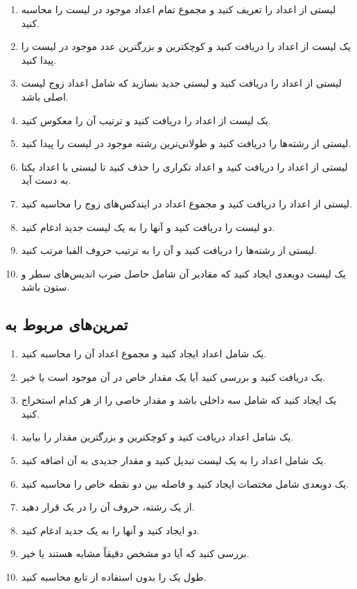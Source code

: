 \documentclass[b5paper,12pt]{article}
\begin{document}
	\begin{enumerate}
		\item لیستی از اعداد را تعریف کنید و مجموع تمام اعداد موجود در لیست را محاسبه کنید.
		\item یک لیست از اعداد را دریافت کنید و کوچکترین و بزرگترین عدد موجود در لیست را پیدا کنید.
		\item لیستی از اعداد را دریافت کنید و لیستی جدید بسازید که شامل اعداد زوج لیست اصلی باشد.
		\item یک لیست از اعداد را دریافت کنید و ترتیب آن را معکوس کنید.
		\item لیستی از رشته‌ها را دریافت کنید و طولانی‌ترین رشته موجود در لیست را پیدا کنید.
		\item لیستی از اعداد را دریافت کنید و اعداد تکراری را حذف کنید تا لیستی با اعداد یکتا به دست آید.
		\item لیستی از اعداد را دریافت کنید و مجموع اعداد در ایندکس‌های زوج را محاسبه کنید.
		\item دو لیست را دریافت کنید و آنها را به یک لیست جدید ادغام کنید.
		\item لیستی از رشته‌ها را دریافت کنید و آن را به ترتیب حروف الفبا مرتب کنید.
		\item یک لیست دو‌بعدی ایجاد کنید که مقادیر آن شامل حاصل ضرب اندیس‌های سطر و ستون باشد.
	\end{enumerate}
	
	\subsection*{تمرین‌های مربوط به }
	
	\begin{enumerate}
		\item یک  شامل اعداد ایجاد کنید و مجموع اعداد آن را محاسبه کنید.
		\item یک  دریافت کنید و بررسی کنید آیا یک مقدار خاص در آن موجود است یا خیر.
		\item یک  ایجاد کنید که شامل سه  داخلی باشد و مقدار خاصی را از هر کدام استخراج کنید.
		\item یک  شامل اعداد دریافت کنید و کوچکترین و بزرگترین مقدار را بیابید.
		\item یک  شامل اعداد را به یک لیست تبدیل کنید و مقدار جدیدی به آن اضافه کنید.
		\item یک  دو‌بعدی شامل مختصات ایجاد کنید و فاصله بین دو نقطه خاص را محاسبه کنید.
		\item از یک رشته، حروف آن را در یک  قرار دهید.
		\item دو  ایجاد کنید و آنها را به یک  جدید ادغام کنید.
		\item بررسی کنید که آیا دو  مشخص دقیقاً مشابه هستند یا خیر.
		\item طول یک  را بدون استفاده از تابع  محاسبه کنید.
	\end{enumerate}
	
\end{document}
